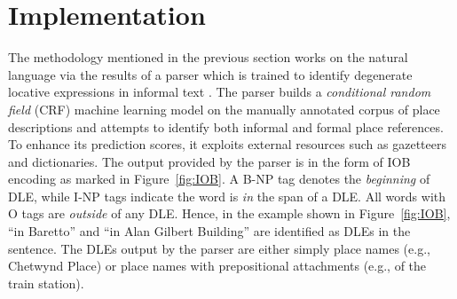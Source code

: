 \documentclass{acm_proc_article-sp}
\begin{document}


\section{Implementation}
The methodology mentioned in the previous section works on the natural language via the results of a parser which is trained to identify degenerate locative expressions in informal text \cite{fei:locative}. The parser builds a \textit{conditional random field} (CRF) machine learning model on the manually annotated corpus of place descriptions \cite{tuw} and attempts to identify both informal and formal place references. To enhance its prediction scores, it exploits external resources such as gazetteers and dictionaries. The output provided by the parser is in the form of IOB encoding as marked in Figure~\ref{fig:IOB}. A B-NP tag denotes the \textit{beginning} of DLE, while I-NP tags indicate the word is \textit{in} the span of a DLE. All words with O tags are \textit{outside} of any DLE. Hence, in the example shown in Figure~\ref{fig:IOB},  ``in Baretto'' and ``in Alan Gilbert Building'' are identified as DLEs in the sentence. The DLEs output by the parser are either simply place names (e.g., Chetwynd Place) or place names with prepositional attachments (e.g., of the train station).
\end{document}
